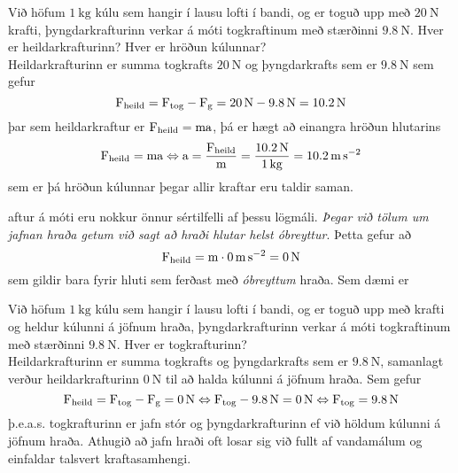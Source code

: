 \begin{formalexample}
Við höfum $\SI{1}{\kilo\gram}$ kúlu sem hangir í lausu lofti í bandi, og er toguð upp
með $\SI{20}{\newton}$ krafti, þyngdarkrafturinn verkar á móti
togkraftinum með stærðinni $\SI{9.8}{\newton}$. 
Hver er heildarkrafturinn? Hver er hröðun kúlunnar?
\\[4 ex]
Heildarkrafturinn er summa togkrafts $\SI{20}{\newton}$ og þyngdarkrafts sem 
er $\SI{9.8}{\newton}$
sem gefur
\[
	\textrm{F}_\text{heild} = \textrm{F}_\text{tog} - \textrm{F}_\text{g}
		= \SI{20}{\newton} - \SI{9.8}{\newton} = \SI{10.2}{\newton}
\]
þar sem heildarkraftur er $\textrm{F}_\text{heild} = \textrm{m}\textrm{a}$, þá er hægt
að einangra hröðun hlutarins
\[
	\textrm{F}_\text{heild} = \textrm{m}\textrm{a} 
		\Leftrightarrow
		\textrm{a} = \frac{\textrm{F}_\text{heild}}{\textrm{m}}
			= \frac{
				\SI{10.2}{\newton}
				}{
				\SI{1}{\kilo\gram}
				}
			= \SI{10.2}{\meter\per\second\squared}
\]
sem er þá hröðun kúlunnar þegar allir kraftar eru taldir saman.
\end{formalexample}
aftur á móti eru nokkur önnur sértilfelli af þessu lögmáli. \emph{Þegar við tölum um
jafnan hraða getum við sagt að hraði hlutar helst óbreyttur}. Þetta gefur að
\[
	\textrm{F}_\text{heild} = \textrm{m} \cdot \SI{0}{\meter\per\second\squared} 
		= \SI{0}{\newton}
\]
sem gildir bara fyrir hluti sem ferðast með \emph{óbreyttum} hraða. Sem dæmi er
\begin{formalexample}
Við höfum $\SI{1}{\kilo\gram}$ kúlu sem hangir í lausu lofti í bandi, og er toguð upp
með krafti og heldur kúlunni á jöfnum hraða, þyngdarkrafturinn verkar á móti
togkraftinum með stærðinni $\SI{9.8}{\newton}$. 
Hver er togkrafturinn? 
\\[4 ex]
Heildarkrafturinn er summa togkrafts og þyngdarkrafts sem er 
$\SI{9.8}{\newton}$, 
samanlagt verður heildarkrafturinn $\SI{0}{\newton}$ til að halda
kúlunni á jöfnum hraða. Sem gefur
\[
	\textrm{F}_\text{heild} = \textrm{F}_\text{tog} - \textrm{F}_\text{g} = \SI{0}{\newton}
	\Leftrightarrow
	\textrm{F}_\text{tog} - \SI{9.8}{\newton} = \SI{0}{\newton}
	\Leftrightarrow
	\textrm{F}_\text{tog} = \SI{9.8}{\newton}
\]
þ.e.a.s. togkrafturinn er jafn stór og þyngdarkrafturinn ef við höldum kúlunni
á jöfnum hraða. Athugið að jafn hraði oft losar sig við fullt af vandamálum og
einfaldar talsvert kraftasamhengi.
\end{formalexample}

